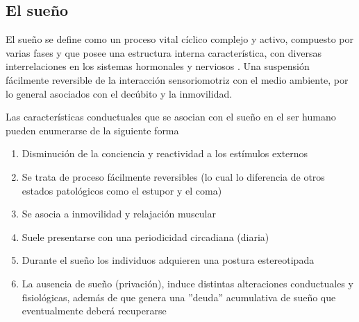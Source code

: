 

\subsection{El sue\~no}


El sue\~no se define como un proceso vital c\'iclico complejo y activo, compuesto por varias 
fases y que posee una estructura interna caracter\'istica, con diversas interrelaciones en los 
sistemas hormonales y nerviosos \cite{FernandezConde07}. Una suspensi\'on f\'acilmente reversible 
de la interacci\'on sensoriomotriz con el medio ambiente, por lo general asociados con el 
dec\'ubito y la inmovilidad.


Las caracter\'isticas conductuales que se asocian con el sue\~no en el ser humano pueden 
enumerarse de la siguiente forma\cite{CarrilloMora} 
\begin{enumerate}
\item Disminuci\'on de la conciencia y reactividad a los est\'imulos externos
\item Se trata de proceso f\'acilmente reversibles (lo cual lo diferencia de otros estados 
patol\'ogicos como el estupor y el coma)
\item Se asocia a inmovilidad y relajaci\'on muscular
\item Suele presentarse con una periodicidad circadiana (diaria)
\item Durante el sue\~no los individuos adquieren una postura estereotipada
\item La ausencia de sue\~no (privaci\'on), induce distintas alteraciones conductuales y 
fisiol\'ogicas, adem\'as de que genera una ''deuda'' acumulativa de sueño que eventualmente 
deber\'a recuperarse 
\end{enumerate}

